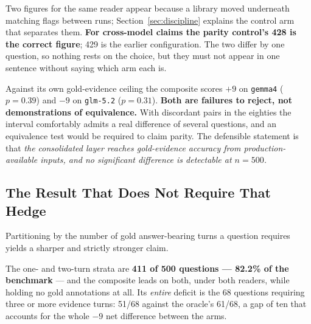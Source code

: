 Two figures for the same reader appear because a library moved underneath matching flags between runs; Section~\ref{sec:discipline} explains the control arm that separates them. \textbf{For cross-model claims the parity control's 428 is the correct figure}; 429 is the earlier configuration. The two differ by one question, so nothing rests on the choice, but they must not appear in one sentence without saying which arm each is.

Against its own gold-evidence ceiling the composite scores $+9$ on \texttt{gemma4} ($p = 0.39$) and $-9$ on \texttt{glm-5.2} ($p = 0.31$). \textbf{Both are failures to reject, not demonstrations of equivalence.} With discordant pairs in the eighties the interval comfortably admits a real difference of several questions, and an equivalence test would be required to claim parity. The defensible statement is that \emph{the consolidated layer reaches gold-evidence accuracy from production-available inputs, and no significant difference is detectable at $n=500$.}

\subsection{The Result That Does Not Require That Hedge}

Partitioning by the number of gold answer-bearing turns a question requires yields a sharper and strictly stronger claim.

\begin{table}[!htbp]
\centering
\caption{Accuracy by required evidence turns. The composite leads gold-evidence selection at one and two turns under \emph{both} readers.}
\label{tab:strata}
\end{table}

The one- and two-turn strata are \textbf{411 of 500 questions --- 82.2\% of the benchmark} --- and the composite leads on both, under both readers, while holding no gold annotations at all. Its \emph{entire} deficit is the 68 questions requiring three or more evidence turns: 51/68 against the oracle's 61/68, a gap of ten that accounts for the whole $-9$ net difference between the arms.

